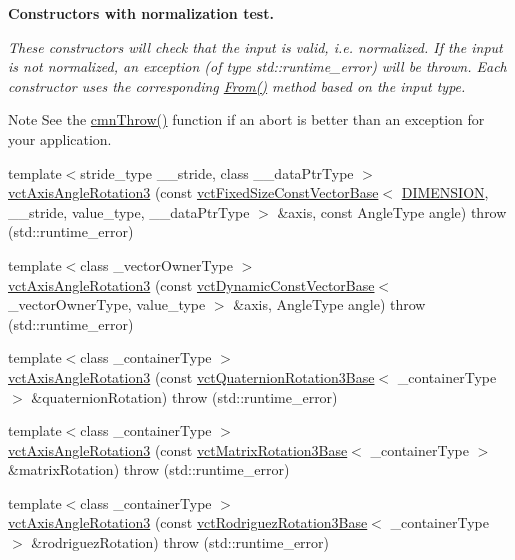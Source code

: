 \begin{Indent}{\bf Constructors with normalization test.}\par
{\em These constructors will check that the input is valid, i.\-e. normalized. If the input is not normalized, an exception (of type {\ttfamily std\-::runtime\-\_\-error}) will be thrown. Each constructor uses the corresponding \hyperlink{classvct_axis_angle_rotation3_a296f32cc8359a9b986f1d15dd1834aa0}{From()} method based on the input type.

\begin{DoxyNote}{Note}
See the \hyperlink{_minimal_cmn_8h_ad50e82cf9c9dbd0e6443c13e0d1a6f1a}{cmn\-Throw()} function if an {\ttfamily abort} is better than an exception for your application. 
\end{DoxyNote}
}\begin{DoxyCompactItemize}
\item 
{\footnotesize template$<$stride\-\_\-type \-\_\-\-\_\-stride, class \-\_\-\-\_\-data\-Ptr\-Type $>$ }\\\hyperlink{classvct_axis_angle_rotation3_ada2d924fbd3a153056a59386780f3131}{vct\-Axis\-Angle\-Rotation3} (const \hyperlink{classvct_fixed_size_const_vector_base}{vct\-Fixed\-Size\-Const\-Vector\-Base}$<$ \hyperlink{classvct_axis_angle_rotation3_a278b4a98a62e4f5ff42ce055836240a9a778d22dfe29402d2cfdd381c1b870285}{D\-I\-M\-E\-N\-S\-I\-O\-N}, \-\_\-\-\_\-stride, value\-\_\-type, \-\_\-\-\_\-data\-Ptr\-Type $>$ \&axis, const Angle\-Type angle)  throw (std\-::runtime\-\_\-error)
\item 
{\footnotesize template$<$class \-\_\-vector\-Owner\-Type $>$ }\\\hyperlink{classvct_axis_angle_rotation3_aaca2918591b9722203a8fcdf793e6abe}{vct\-Axis\-Angle\-Rotation3} (const \hyperlink{classvct_dynamic_const_vector_base}{vct\-Dynamic\-Const\-Vector\-Base}$<$ \-\_\-vector\-Owner\-Type, value\-\_\-type $>$ \&axis, Angle\-Type angle)  throw (std\-::runtime\-\_\-error)
\item 
{\footnotesize template$<$class \-\_\-container\-Type $>$ }\\\hyperlink{classvct_axis_angle_rotation3_a04fa3bc0de3bcbb8399125d1509008d0}{vct\-Axis\-Angle\-Rotation3} (const \hyperlink{classvct_quaternion_rotation3_base}{vct\-Quaternion\-Rotation3\-Base}$<$ \-\_\-container\-Type $>$ \&quaternion\-Rotation)  throw (std\-::runtime\-\_\-error)
\item 
{\footnotesize template$<$class \-\_\-container\-Type $>$ }\\\hyperlink{classvct_axis_angle_rotation3_ae5f8d6b81b3784ebb1ee58ec7f5bca27}{vct\-Axis\-Angle\-Rotation3} (const \hyperlink{classvct_matrix_rotation3_base}{vct\-Matrix\-Rotation3\-Base}$<$ \-\_\-container\-Type $>$ \&matrix\-Rotation)  throw (std\-::runtime\-\_\-error)
\item 
{\footnotesize template$<$class \-\_\-container\-Type $>$ }\\\hyperlink{classvct_axis_angle_rotation3_a38b21663c016386d0b5a961a23b98b04}{vct\-Axis\-Angle\-Rotation3} (const \hyperlink{classvct_rodriguez_rotation3_base}{vct\-Rodriguez\-Rotation3\-Base}$<$ \-\_\-container\-Type $>$ \&rodriguez\-Rotation)  throw (std\-::runtime\-\_\-error)
\end{DoxyCompactItemize}
\end{Indent}
